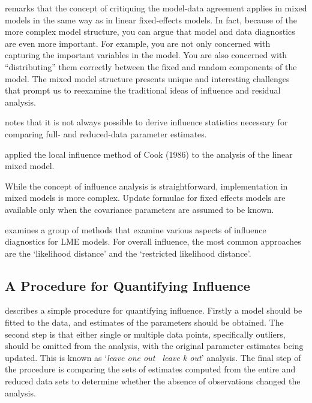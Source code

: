 \documentclass[12pt, a4paper]{report}
\theoremstyle{plain}
\theoremstyle{definition}
\theoremstyle{remark}
\begin{document}
\citet{schabenberger} remarks that the concept of critiquing the model-data agreement applies in mixed models in the same way as in linear
fixed-effects models. In fact, because of the more complex model structure, you can argue that model and
data diagnostics are even more important. For example, you are not only concerned with capturing the
important variables in the model. You are also concerned with ``distributing” them correctly between the
fixed and random components of the model. The mixed model structure presents unique and interesting
challenges that prompt us to reexamine the traditional ideas of influence and residual analysis.

		

\citet{schabenberger} notes that it is not always possible to derive influence statistics necessary for comparing full- and
reduced-data parameter estimates. 

\citet{Beckman} applied the local influence method of Cook (1986) to the analysis of the linear mixed model.

While the concept of influence analysis is straightforward, implementation in mixed models is more complex. Update formulae for fixed effects models are available only when the covariance parameters are assumed to be known.

\citet{west} examines a group of methods that examine various aspects of influence diagnostics for LME models. For overall influence, the most common approaches are the `likelihood distance' and the `restricted likelihood distance'.




\subsection{A Procedure for Quantifying Influence}  %
\citet{schabenberger} describes a simple procedure for quantifying influence. Firstly a model should be fitted to the data, and
estimates of the parameters should be obtained. The second step is that either single or multiple data points, specifically outliers,
should be omitted from the analysis, with the original parameter estimates being updated. This is known as `\textit{leave one out \ leave k out}' analysis. The final step of the procedure is comparing the sets of estimates computed from the entire and reduced data sets to determine whether the absence of observations changed the
analysis.
\end{document}
